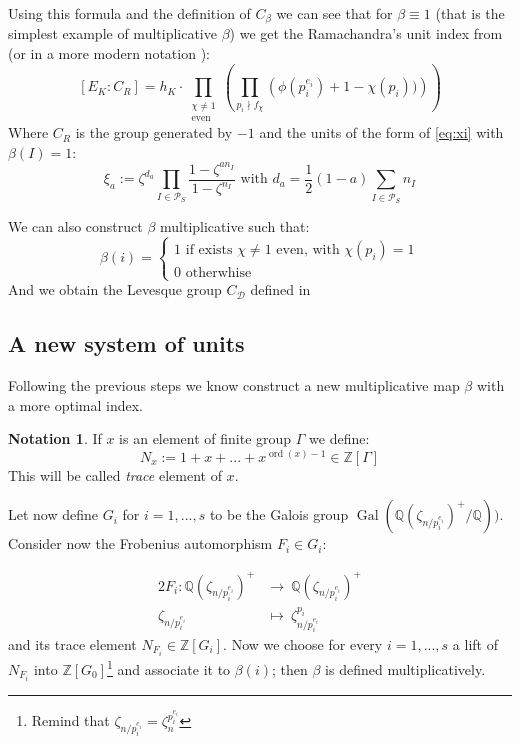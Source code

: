 \documentclass[]{article}
\theoremstyle{plain}
\theoremstyle{remark}
\theoremstyle{definition}
\newtheorem*{nota}{Notation}
\newcommand{\PS}{\mathcal{P}_S}
\newcommand{\Z}{\mathbb{Z}}
\newcommand{\Q}{\mathbb{Q}}
\DeclareMathOperator{\Gal}{Gal}
\DeclareMathOperator{\ord}{ord}
\begin{document}
	Using this formula and the definition of $ C_\beta $ we can see that for $\beta \equiv 1 $ (that is the simplest example of multiplicative $\beta$) we get the Ramachandra's unit index from \cite{RAM} (or in a more modern notation \cite[Theorem~8.3]{CF} ):
	\begin{equation}\label{eq:idx_ram}
		[E_K : C_R ] = h_K \cdot  \prod_{ \substack{\chi \neq 1 \\ \text{even}}} \left( \prod_{p_i \nmid f_\chi} \left( \phi (p_i^{e_i})  + 1- \chi (p_i))\right)  \right) 
	\end{equation}
	Where $ C_R $ is the group generated by $ -1 $ and the units of the form of \ref{eq:xi} with $ \beta(I) = 1  $:
	\[ \xi_a := \zeta ^{d_a } \prod _{I \in \PS} \frac{ 1 - \zeta^{an_I}}{ 1 - \zeta^{n_I}}  \text{ with } d_a =\frac{1}{2}(1-a) \sum_{I \in \PS} n_I\]
	
	We can also construct $\beta$ multiplicative such that:
	\[ \beta(i) = \begin{cases} 1 \text{ if exists } \chi \neq 1 \text{ even, with } \chi(p_i)=1 \\ 0 \text{ otherwhise } \end{cases}\]
	And we obtain the Levesque group $ C_\mathcal{D} $ defined in \cite[Page~331]{LEV}
	
	\subsection{A new system of units}
	
	Following the previous steps we know construct a new multiplicative map $\beta$ with a more optimal index. 
	\begin{nota}
		If $ x $ is an element of finite group $\Gamma$ we define:
		\[ N_x := 1 + x + ... + x^{\ord (x) - 1} \in \Z[\Gamma]\]
		This will be called \textit{trace} element of $ x $.
	\end{nota}

	Let now define $ G_i $ for $ i=1,...,s $ to be the Galois group $ \Gal ( \Q(\zeta_{n/p_i^{e_i}})^+ / \Q)) $. Consider now the Frobenius automorphism $F_i \in G_i$:  
	
	\begin{alignat*}{2}
		F_i : \Q(\zeta_{n/p_i^{e_i}})^+ &\longrightarrow \: \Q(\zeta_{n/p_i^{e_i}})^+  \\
		\zeta_{n/p_i^{e_i}}  &\longmapsto \: \zeta_{n/p_i^{e_i}} ^ {p_i}
		\end{alignat*} 
	and its trace element $ N_{F_i} \in \Z [G_i]$. Now we choose for every $ i=1, ... , s $ a lift of $ N_{F_i} $ into $ \Z[G_0] $\footnote{Remind that $ \zeta_{n/p_i^{e_i}} = \zeta_n^{p_i^{e_i}}$} and associate it to $\beta(i)$; then $\beta$ is defined multiplicatively. 
	
\end{document}
